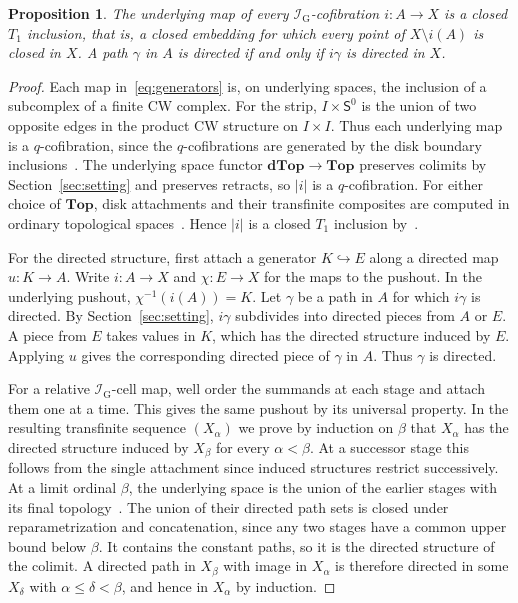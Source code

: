 \documentclass[12pt,a4paper]{amsart}
\newtheorem{proposition}[theorem]{Proposition}
\theoremstyle{definition}
\renewcommand{\leq}{\leqslant}
\newcommand{\D}{\mathbf{dTop}}
\newcommand{\I}{\mathcal I_{\mathrm G}}
\newcommand{\abs}[1]{\lvert#1\rvert}
\begin{document}
\begin{proposition}\label{prop:closed-inclusions}
The underlying map of every $\I$-cofibration $i\colon A\to X$ is a closed $T_1$ inclusion, that is, a closed embedding for which every point of $X\setminus i(A)$ is closed in $X$. A path $\gamma$ in $A$ is directed if and only if $i\gamma$ is directed in $X$.
\end{proposition}
\begin{proof}
Each map in~\eqref{eq:generators} is, on underlying spaces, the inclusion of a subcomplex of a finite CW complex. For the strip, $I\times\mathsf{S}^0$ is the union of two opposite edges in the product CW structure on $I\times I$. Thus each underlying map is a $q$-cofibration, since the $q$-cofibrations are generated by the disk boundary inclusions~\cite[Section~2 and Appendix~B, p.~608]{leftproperflow}. The underlying space functor $\D\to\mathbf{Top}$ preserves colimits by Section~\ref{sec:setting} and preserves retracts, so $\abs i$ is a $q$-cofibration. For either choice of $\mathbf{Top}$, disk attachments and their transfinite composites are computed in ordinary topological spaces~\cite[Propositions~B.15 and~B.16]{leftproperflow}. Hence $\abs i$ is a closed $T_1$ inclusion by~\cite[Corollary~2.4.6]{MR99h:55031}.

For the directed structure, first attach a generator $K\hookrightarrow E$ along a directed map $u\colon K\to A$. Write $i\colon A\to X$ and $\chi\colon E\to X$ for the maps to the pushout. In the underlying pushout, $\chi^{-1}(i(A))=K$. Let $\gamma$ be a path in $A$ for which $i\gamma$ is directed. By Section~\ref{sec:setting}, $i\gamma$ subdivides into directed pieces from $A$ or $E$. A piece from $E$ takes values in $K$, which has the directed structure induced by $E$. Applying $u$ gives the corresponding directed piece of $\gamma$ in $A$. Thus $\gamma$ is directed.

For a relative $\I$-cell map, well order the summands at each stage and attach them one at a time. This gives the same pushout by its universal property. In the resulting transfinite sequence $(X_\alpha)$ we prove by induction on $\beta$ that $X_\alpha$ has the directed structure induced by $X_\beta$ for every $\alpha<\beta$. At a successor stage this follows from the single attachment since induced structures restrict successively. At a limit ordinal $\beta$, the underlying space is the union of the earlier stages with its final topology~\cite[Proposition~B.16]{leftproperflow}. The union of their directed path sets is closed under reparametrization and concatenation, since any two stages have a common upper bound below $\beta$. It contains the constant paths, so it is the directed structure of the colimit. A directed path in $X_\beta$ with image in $X_\alpha$ is therefore directed in some $X_\delta$ with $\alpha\leq\delta<\beta$, and hence in $X_\alpha$ by induction.


\end{proof}
\end{document}
